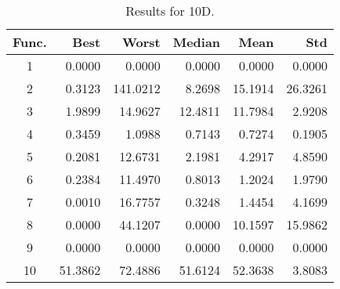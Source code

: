 \begin{table}[ht]
\centering
\caption{ Results for 10D. }
\label{tab:10D}
\begin{tabular}{crrrrr}
\hline
{Func.} & Best & Worst & Median & Mean & Std \\
\hline
1 & 0.0000 & 0.0000 & 0.0000 & 0.0000 & 0.0000 \\
2 & 0.3123 & 141.0212 & 8.2698 & 15.1914 & 26.3261 \\
3 & 1.9899 & 14.9627 & 12.4811 & 11.7984 & 2.9208 \\
4 & 0.3459 & 1.0988 & 0.7143 & 0.7274 & 0.1905 \\
5 & 0.2081 & 12.6731 & 2.1981 & 4.2917 & 4.8590 \\
6 & 0.2384 & 11.4970 & 0.8013 & 1.2024 & 1.9790 \\
7 & 0.0010 & 16.7757 & 0.3248 & 1.4454 & 4.1699 \\
8 & 0.0000 & 44.1207 & 0.0000 & 10.1597 & 15.9862 \\
9 & 0.0000 & 0.0000 & 0.0000 & 0.0000 & 0.0000 \\
10 & 51.3862 & 72.4886 & 51.6124 & 52.3638 & 3.8083 \\
\hline
\end{tabular}
\end{table}
